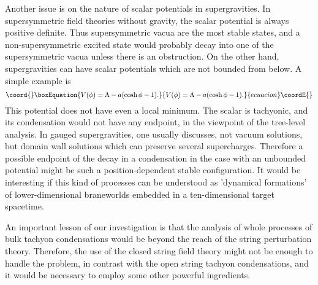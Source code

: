 \documentclass[a4paper,a4paper]{article}
\begin{document}
Another issue is on the nature of scalar potentials in supergravities. 
In supersymmetric field theories without gravity, the scalar potential is always positive definite. 
Thus supersymmetric vacua are the most stable states, and a non-supersymmetric excited state would probably decay 
into one of the supersymmetric vacua unless there is an obstruction. 
On the other hand, supergravities can have scalar potentials which are not bounded from below. 
A simple example is \cite{unbounded}
\begin{equation}\coord{}\boxEquation{
V(\phi) = \Lambda-a(\cosh\phi-1).
}{
V(\phi) = \Lambda-a(\cosh\phi-1).
}{ecuacion}\coordE{}\end{equation}
This potential does not have even a local minimum. 
The scalar \myHighlight{$\phi$}\coordHE{} is tachyonic, and its condensation would not have any endpoint, in the viewpoint of  the 
tree-level analysis. 
In gauged supergravities, one usually discusses, not vacuum solutions, but domain wall solutions which can preserve 
several supercharges. 
Therefore a possible endpoint of the decay in a condensation in the case 
with an unbounded potential might be such a position-dependent 
stable configuration. 
It would be interesting if this kind of processes can be understood as 'dynamical formations' of 
lower-dimensional braneworlds embedded in a ten-dimensional target spacetime. 

An important lesson of our investigation is that the analysis of 
whole processes of bulk tachyon condensations would be beyond 
the reach of the string perturbation theory. 
Therefore, the use of the closed string field theory might not be enough to handle the problem, 
in contrast with the open string tachyon condensations, 
and it would be necessary to employ some other powerful ingredients. 





















\newpage
\end{document}
